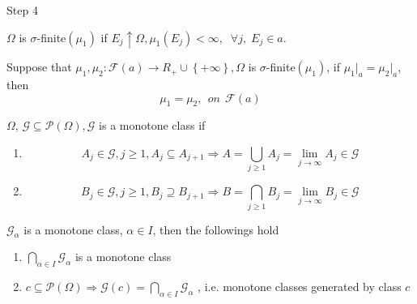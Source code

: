 {\large Step 4}

\begin{definition}
	$\Omega $ is $ \sigma $-finite$ (\mu_{1}) $  if ${E_j} \uparrow \Omega ,{\mu _1}\left( {{E_j}} \right) < \infty ,\;\;\forall j,\;{E_j} \in a$.
	\label{def4.4}
\end{definition}

\begin{theorem}[Uniqueness]
	Suppose that ${\mu _1},{\mu _2}:\mathcal{F}\left( a \right) \to {R_ + } \cup \left\{ { + \infty } \right\},\Omega $ is $ \sigma $-finite$ (\mu_{1}) $, if ${\mu _1}{|_a} = {\mu _2}{|_a}$, then 
	\begin{equation}
	{\mu _1} = {\mu _2}, \ \ on\ \ \mathcal{F}(a)
	\label{eq4.53}
	\end{equation}
	\label{thm4.4}
\end{theorem}

\begin{definition}
	$ \Omega $, $ \mathcal{G} \subseteq \mathcal{P}\left(\Omega\right), \mathcal{G} $ is a monotone class if
	\begin{enumerate}
		\item  
		\begin{equation}
		{A_j} \in \mathcal{G},j \geqslant 1,{A_j} \subseteq {A_{j + 1}} \Rightarrow A = \bigcup\limits_{j \geqslant 1} {{A_j}}  = \mathop {\lim }\limits_{j \to \infty } {A_j} \in \mathcal{G}
		\label{eq4.54}
		\end{equation}
		\item 
		\begin{equation}
		{B_j} \in \mathcal{G},j \geqslant 1,{B_j} \supseteq {B_{j + 1}} \Rightarrow B = \bigcap\limits_{j \geqslant 1} {{B_j}}  = \mathop {\lim }\limits_{j \to \infty } {B_j} \in \mathcal{G}
		\label{eq4.55}
		\end{equation}
	\end{enumerate}
	\label{def4.5}
\end{definition}

\begin{theorem}
	${\mathcal{G}_\alpha }$ is a monotone class, $ \alpha \in I $, then the followings hold
	\begin{enumerate}
		\item $\bigcap\limits_{\alpha  \in I} {{\mathcal{G}_\alpha }} $ is a monotone class
		\item $c \subseteq \mathcal{P}\left( \Omega  \right) \Rightarrow \mathcal{G}\left( c \right) = \bigcap\limits_{\alpha  \in I} {{\mathcal{G}_\alpha }} $ , i.e. monotone classes generated by class $ c $
	\end{enumerate}
	\label{thm4.5}
\end{theorem}

